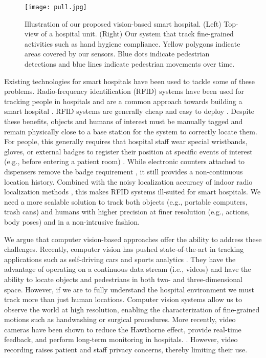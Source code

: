 \documentclass[twoside,11pt]{article}
\begin{document}
\begin{figure}[t]
    \centering
    \texttt{[image: pull.jpg]}
    \caption{Illustration of our proposed vision-based smart hospital. (Left) Top-view of a hospital unit. (Right) Our system that track  fine-grained activities such as hand hygiene compliance. Yellow polygons indicate areas covered by our sensors. Blue dots indicate pedestrian detections and blue lines indicate pedestrian movements over time.}
    \label{fig:pull}
\end{figure}

Existing technologies for smart hospitals have been used to tackle some of these problems. Radio-frequency identification (RFID) systems have been used for tracking people in hospitals and are a common approach towards building a smart hospital \citep{fuhrer2006building, pineles2013rfid, polgreen2010method}. RFID systems are generally cheap and easy to deploy \citep{coustasse2013impact}.
Despite these benefits, objects and humans of interest must be manually tagged and remain physically close to a base station for the system to correctly locate them.
For people, this generally requires that hospital staff wear special wristbands, gloves, or external badges to register their position at specific events of interest (e.g., before entering a patient room) \citep{simmonds2011utility, yao2010use}.
While electronic counters attached to dispensers remove the badge requirement \citep{sahud2010electronic}, it still provides a non-continuous location history.
Combined with the noisy localization accuracy of indoor radio localization methods \citep{whitehouse2007practical, alahi2015rgbw, marra2014new, zanca2008experimental}, this makes RFID systems ill-suited for smart hospitals.
We need a more scalable solution to track both objects (e.g., portable computers, trash cans) and humans with higher precision at finer resolution (e.g., actions, body poses) and in a non-intrusive fashion.


We argue that computer vision-based approaches offer the ability to address these challenges. Recently, computer vision has pushed state-of-the-art in tracking applications such as self-driving cars \citep{cho2014multi} and sports analytics \citep{halvorsen2013bagadus, pers2000computer}.
They have the advantage of operating on a continuous data stream (i.e., videos) and have the ability to locate objects and pedestrians in both two- and three-dimensional space.
However, if we are to fully understand the hospital environment we must track more than just human locations.
Computer vision systems allow us to observe the world at high resolution, enabling the characterization of fine-grained motions such as handwashing or surgical procedures.
More recently, video cameras have been shown to reduce the Hawthorne effect, provide real-time feedback, and perform long-term monitoring in hospitals. \citep{armellino2013replicating, nishimura1999handwashing}.
However, video recording raises patient and staff privacy concerns, thereby limiting their use.
        
\end{document}
